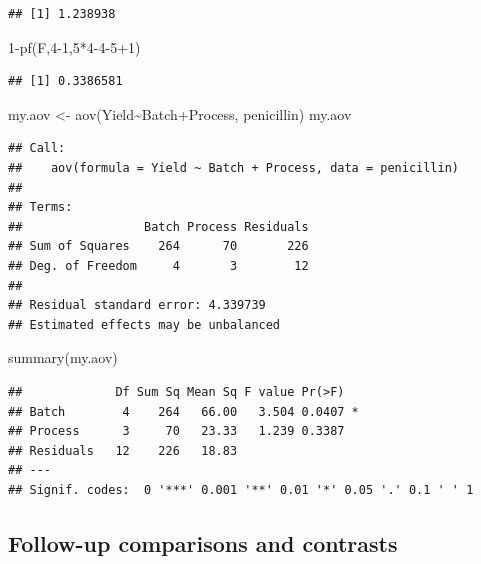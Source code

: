 \documentclass[
]{book}
\newenvironment{Shaded}{\begin{snugshade}}{\end{snugshade}}
\newcommand{\DecValTok}[1]{\textcolor[rgb]{0.00,0.00,0.81}{#1}}
\newcommand{\FunctionTok}[1]{\textcolor[rgb]{0.00,0.00,0.00}{#1}}
\newcommand{\NormalTok}[1]{#1}
\newcommand{\OtherTok}[1]{\textcolor[rgb]{0.56,0.35,0.01}{#1}}
\newcommand{\SpecialCharTok}[1]{\textcolor[rgb]{0.00,0.00,0.00}{#1}}
\begin{document}
\begin{verbatim}
## [1] 1.238938
\end{verbatim}

\begin{Shaded}
\begin{Highlighting}[]
\DecValTok{1}\SpecialCharTok{{-}}\FunctionTok{pf}\NormalTok{(F,}\DecValTok{4{-}1}\NormalTok{,}\DecValTok{5}\SpecialCharTok{*}\DecValTok{4{-}4{-}5}\SpecialCharTok{+}\DecValTok{1}\NormalTok{)}
\end{Highlighting}
\end{Shaded}

\begin{verbatim}
## [1] 0.3386581
\end{verbatim}

\begin{Shaded}
\begin{Highlighting}[]
\NormalTok{my.aov }\OtherTok{\textless{}{-}} \FunctionTok{aov}\NormalTok{(Yield}\SpecialCharTok{\textasciitilde{}}\NormalTok{Batch}\SpecialCharTok{+}\NormalTok{Process, penicillin)}
\NormalTok{my.aov}
\end{Highlighting}
\end{Shaded}

\begin{verbatim}
## Call:
##    aov(formula = Yield ~ Batch + Process, data = penicillin)
## 
## Terms:
##                 Batch Process Residuals
## Sum of Squares    264      70       226
## Deg. of Freedom     4       3        12
## 
## Residual standard error: 4.339739
## Estimated effects may be unbalanced
\end{verbatim}

\begin{Shaded}
\begin{Highlighting}[]
\FunctionTok{summary}\NormalTok{(my.aov)}
\end{Highlighting}
\end{Shaded}

\begin{verbatim}
##             Df Sum Sq Mean Sq F value Pr(>F)  
## Batch        4    264   66.00   3.504 0.0407 *
## Process      3     70   23.33   1.239 0.3387  
## Residuals   12    226   18.83                 
## ---
## Signif. codes:  0 '***' 0.001 '**' 0.01 '*' 0.05 '.' 0.1 ' ' 1
\end{verbatim}

\hypertarget{follow-up-comparisons-and-contrasts}{%
\subsection{Follow-up comparisons and contrasts}\label{follow-up-comparisons-and-contrasts}}
\end{document}
